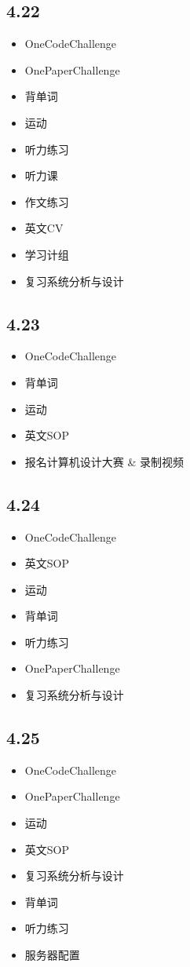 \documentclass[UTF8]{ctexart}
\begin{document}
\subsection*{4.22}
\begin{itemize}
    \item OneCodeChallenge
    \item OnePaperChallenge
    \item 背单词
    \item 运动
    \item 听力练习
    \item 听力课
    \item 作文练习
    \item 英文CV
    \item 学习计组
    \item 复习系统分析与设计
\end{itemize}

\subsection*{4.23}
\begin{itemize}
    \item OneCodeChallenge
    \item 背单词
    \item 运动
    \item 英文SOP
    \item 报名计算机设计大赛 \& 录制视频
\end{itemize}

\subsection*{4.24}
\begin{itemize}
    \item OneCodeChallenge
    \item 英文SOP
    \item 运动
    \item 背单词
    \item 听力练习
    \item OnePaperChallenge
    \item 复习系统分析与设计
\end{itemize}

\subsection*{4.25}
\begin{itemize}
    \item OneCodeChallenge
    \item OnePaperChallenge
    \item 运动
    \item 英文SOP
    \item 复习系统分析与设计
    \item 背单词
    \item 听力练习
    \item 服务器配置
\end{itemize}
\end{document}
